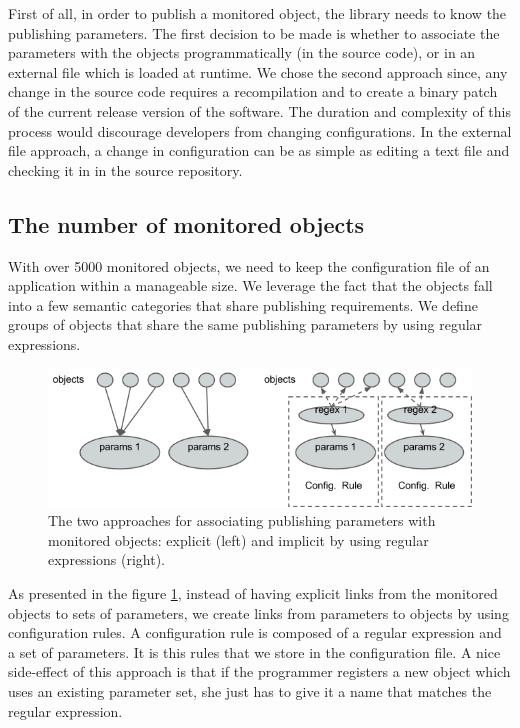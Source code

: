 First of all, in order to publish a monitored object, the library needs to know the publishing parameters. The first decision to be made is whether to associate the parameters with the objects programmatically (in the source code), or in an external file which is loaded at runtime. We chose the second approach since, any change in the source code requires a recompilation and to create a binary patch of the current release version of the software. The duration and complexity of this process would discourage developers from changing configurations. In the external file approach, a change in configuration can be as simple as editing a text file and checking it in in the source repository.

\subsection*{The number of monitored objects}

With over 5000 monitored objects, we need to keep the configuration file of an application within a manageable size. We leverage the fact that the objects fall into a few semantic categories that share publishing requirements. We define groups of objects that share the same publishing parameters by using regular expressions. 

\begin{figure}[ht]
\centering
\includegraphics[scale=0.6]{Images/oks_regex.png}
\caption{The two approaches for associating publishing parameters with monitored objects: explicit (left) and implicit by using regular expressions (right).}
\label{fig:oks_regex}
\end{figure}

As presented in the figure \ref{fig:oks_regex}, instead of having explicit links from the monitored objects to sets of parameters, we create links from parameters to objects by using configuration rules. A configuration rule is composed of a regular expression and a set of parameters. It is this rules that we store in the configuration file. A nice side-effect of this approach is that if the programmer registers a new object which uses an existing parameter set, she just has to give it a name that matches the regular expression.

